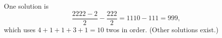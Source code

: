 One solution is
\[\dfrac{2222-2}{2}-\dfrac{222}{2}=1110-111=\boxed{999},\]
which uses $4+1+1+3+1=10$ twos in order. (Other solutions exist.)
